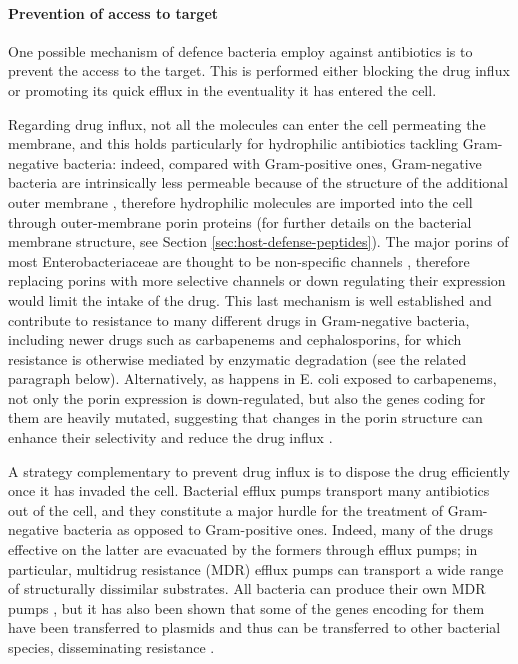 \paragraph{Prevention of access to target}
One possible mechanism of defence bacteria employ against antibiotics is to prevent the access to the target. This is performed either blocking the drug influx or promoting its quick efflux in the eventuality it has entered the cell.

Regarding drug influx, not all the molecules can enter the cell permeating the membrane, and this holds particularly for hydrophilic antibiotics tackling Gram-negative bacteria: indeed, compared with Gram-positive ones, Gram-negative bacteria are intrinsically less permeable because of the structure of the additional outer membrane \cite{Delcour2009}, therefore hydrophilic molecules are imported into the cell through outer-membrane porin proteins \cite{Vargiu2012,Kojima2013} (for further details on the bacterial membrane structure, see Section \ref{sec:host-defense-peptides}).
%
The major porins of most Enterobacteriaceae are thought to be non-specific channels \cite{Tran2013}, therefore replacing porins with more selective channels or down regulating their expression would limit the intake of the drug. This last mechanism is well established and contribute to resistance to many different drugs in Gram-negative bacteria, including newer drugs such as carbapenems and cephalosporins, for which resistance is otherwise mediated by enzymatic degradation \cite{Tamber2003,Baroud2013,Lavigne2013,Poulou2013,Wozniak2012} (see the related paragraph below).
Alternatively, as happens in E. coli exposed to carbapenems, not only the porin expression is down-regulated, but also the genes coding for them are heavily mutated, suggesting that changes in the porin structure can enhance their selectivity and reduce the drug influx \cite{Lavigne2013,Novais2012,Tangden2013}.

A strategy complementary to prevent drug influx is to dispose the drug efficiently once it has invaded the cell. Bacterial efflux pumps transport many antibiotics out of the cell, and they constitute a major hurdle for the treatment of Gram-negative bacteria as opposed to Gram-positive ones. Indeed, many of the drugs effective on the latter are evacuated by the formers through efflux pumps; in particular, multidrug resistance (MDR) efflux pumps can transport a wide range of structurally dissimilar substrates.
%
All bacteria can produce their own MDR pumps \cite{Floyd2010,Hu2012,Kim2013,Ogawa2012}, but it has also been shown that some of the genes encoding for them have been transferred to plasmids and thus can be transferred to other bacterial species, disseminating resistance \cite{Dolejska2013}.


